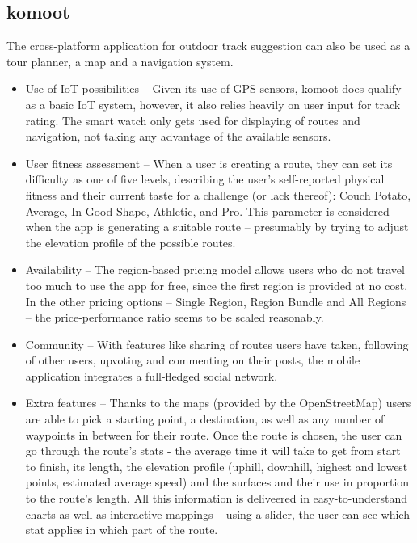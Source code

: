 \subsection{komoot}
The cross-platform application for outdoor track suggestion can also be used as a tour planner, a map and a navigation system.


\begin{itemize}
    \item Use of IoT possibilities -- Given its use of GPS sensors, komoot does qualify as a basic IoT system, however, it also relies heavily on user input for track rating.
    The smart watch only gets used for displaying of routes and navigation, not taking any advantage of the available sensors.
    \item User fitness assessment -- When a user is creating a route, they can set its difficulty as one of five levels, 
    describing the user's self-reported physical fitness and their current taste for a challenge (or lack thereof): Couch Potato, Average, In Good Shape, Athletic, and Pro.
    This parameter is considered when the app is generating a suitable route -- presumably by trying to adjust the elevation profile of the possible routes.
    \item Availability -- The region-based pricing model allows users who do not travel too much to use the app for free,
    since the first region is provided at no cost.
    In the other pricing options -- Single Region, Region Bundle and All Regions -- the price-performance ratio seems to be scaled reasonably. 
    \item Community -- With features like sharing of routes users have taken, following of other users, upvoting and commenting on their posts, the mobile application integrates a full-fledged social network.
    \item Extra features -- Thanks to the maps (provided by the OpenStreetMap) users are able to pick a starting point, a destination, as well as any number of waypoints in between for their route.
    Once the route is chosen, the user can go through the route's stats - the average time it will take to get from start to finish, its length, the elevation profile (uphill, downhill, highest and lowest points, estimated average speed) and the surfaces and their use in proportion to the route's length.
    All this information is deliveered in easy-to-understand charts as well as interactive mappings -- using a slider, the user can see which stat applies in which part of the route.

\end{itemize}
